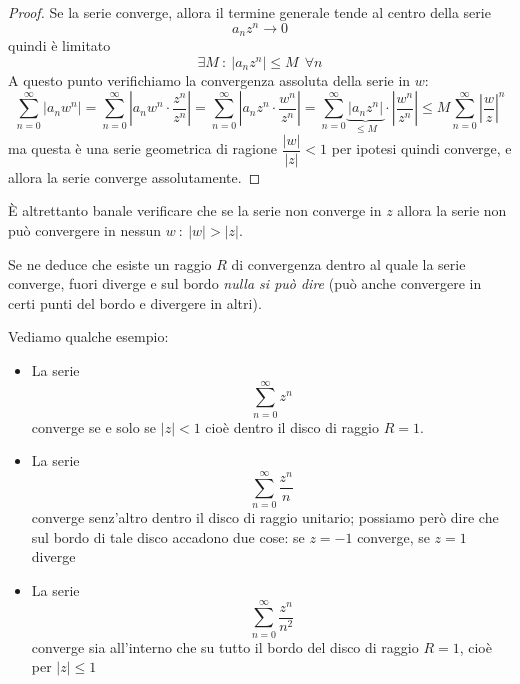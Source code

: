 \begin{proof}
Se la serie converge, allora il termine generale tende al centro della serie
\begin{equation*}
a_{n} z^{n}\rightarrow 0
\end{equation*}
quindi è limitato
\begin{equation*}
\exists M\ :\ \left| a_{n} z^{n}\right| \leq M\ \ \forall n
\end{equation*}
A questo punto verifichiamo la convergenza assoluta della serie in $w$:
\begin{equation*}
\sum\limits^{\infty}_{n = 0}\left| a_{n} w^{n}\right| = \sum\limits^{\infty}_{n = 0} \left|a_{n} w^{n} \cdot \frac{z^n}{z^n} \right| = \sum\limits^{\infty}_{n = 0} \left|a_{n} z^{n} \cdot \frac{w^n}{z^n} \right| = \sum\limits^{\infty}_{n = 0}\underbrace{\left| a_{n} z^{n}\right|}_{\leq M}\cdot \left|\frac{w^n}{z^n}\right| \leq M\sum\limits^{\infty}_{n = 0}\left|\frac{w}{z}\right|^n
\end{equation*}
ma questa è una serie geometrica di ragione $\dfrac{|w|}{| z|} < 1$ per ipotesi quindi converge, e allora la serie converge assolutamente. 
\end{proof}

È altrettanto banale verificare che se la serie non converge in $z$ allora la serie non può convergere in nessun $w\ :\ |w|>|z|$. 

Se ne deduce che esiste un raggio $R$ di convergenza dentro al quale la serie converge, fuori diverge e sul bordo \textit{nulla si può dire} (può anche convergere in certi punti del bordo e divergere in altri).

Vediamo qualche esempio:

\begin{itemize}
\item La serie
\begin{equation*}
\sum\limits^{\infty}_{n = 0} z^{n}
\end{equation*}
converge se e solo se $|z| < 1$ cioè dentro il disco di raggio $R=1$.

\item La serie
\begin{equation*}
\sum\limits^{\infty}_{n = 0}\frac{z^{n}}{n}
\end{equation*}
converge senz'altro dentro il disco di raggio unitario; possiamo però dire che sul bordo di tale disco accadono due cose: se $z=-1$ converge, se $z=1$ diverge

\item La serie
\begin{equation*}
\sum\limits^{\infty}_{n = 0}\frac{z^{n}}{n^{2}}
\end{equation*}
converge sia all'interno che su tutto il bordo del disco di raggio $R=1$, cioè per $| z| \leq 1$
\end{itemize}

